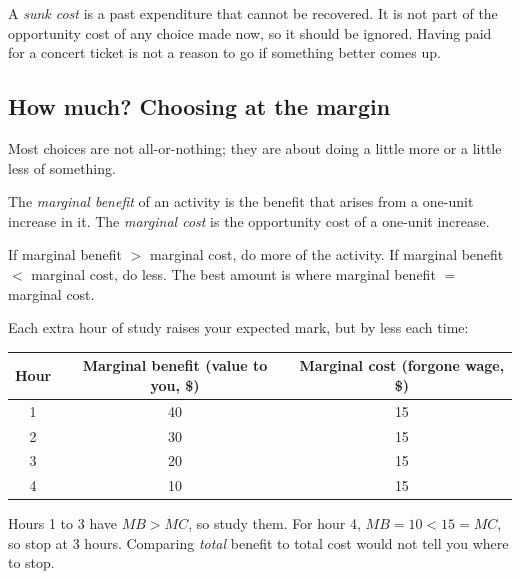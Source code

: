 \begin{important}
A \emph{sunk cost} is a past expenditure that cannot be recovered. It is not part of the
opportunity cost of any choice made now, so it should be ignored. Having paid for a
concert ticket is not a reason to go if something better comes up.
\end{important}

\subsection{How much? Choosing at the margin}

Most choices are not all-or-nothing; they are about doing a little more or a little less
of something.

\begin{definition}
The \emph{marginal benefit} of an activity is the benefit that arises from a one-unit
increase in it. The \emph{marginal cost} is the opportunity cost of a one-unit increase.
\end{definition}

\begin{important}
If marginal benefit $>$ marginal cost, do more of the activity. If marginal benefit
$<$ marginal cost, do less. The best amount is where marginal benefit $=$ marginal cost.
\end{important}

\begin{example}
Each extra hour of study raises your expected mark, but by less each time:
\begin{center}
\begin{tabular}{ccc}
\toprule
Hour & Marginal benefit (value to you, \$) & Marginal cost (forgone wage, \$) \\
\midrule
1 & 40 & 15 \\
2 & 30 & 15 \\
3 & 20 & 15 \\
4 & 10 & 15 \\
\bottomrule
\end{tabular}
\end{center}
Hours 1 to 3 have $MB > MC$, so study them. For hour 4, $MB = 10 < 15 = MC$, so stop at
3 hours. Comparing \emph{total} benefit to total cost would not tell you where to stop.
\end{example}

